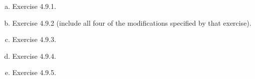 \documentclass[12pt]{article}
\begin{document}
\begin{enumerate}[1.]
    \begin{enumerate}[a)]
        \item Exercise 4.9.1.
        \item Exercise 4.9.2 (include all four of the modifications specified by that exercise).
        \item Exercise 4.9.3.
        \item Exercise 4.9.4.
        \item Exercise 4.9.5.
    \end{enumerate}
\end{enumerate}
\end{document}
